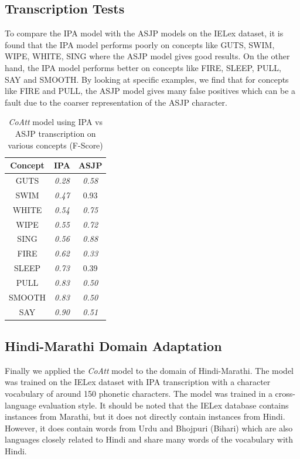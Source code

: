 \documentclass[11pt,letterpaper]{article}
\begin{document}
\subsection{Transcription Tests}

To compare the IPA model with the ASJP models on the IELex dataset, it is found that the IPA model performs poorly on concepts like GUTS, SWIM, WIPE, WHITE, SING where the ASJP model gives good results. On the other hand, the IPA model performs better on concepts like FIRE, SLEEP, PULL, SAY and SMOOTH. By looking at specific examples, we find that for concepts like FIRE and PULL, the ASJP model gives many false positives which can be a fault due to the coarser representation of the ASJP character.

\begin{table}[h]
\centering
\begin{tabular}{ccc}
\textbf{Concept} & \textbf{IPA}  & \textbf{ASJP} \\ \hline
GUTS             & \textit{0.28} & \textit{0.58} \\
SWIM             & \textit{0.47} & 0.93          \\
WHITE            & \textit{0.54} & \textit{0.75} \\
WIPE             & \textit{0.55} & \textit{0.72} \\
SING             & \textit{0.56} & \textit{0.88} \\ \hline
FIRE             & \textit{0.62} & \textit{0.33} \\
SLEEP            & \textit{0.73} & 0.39          \\
PULL             & \textit{0.83} & \textit{0.50} \\
SMOOTH           & \textit{0.83} & \textit{0.50} \\
SAY              & \textit{0.90} & \textit{0.51}
\end{tabular}
\caption{\textit{CoAtt} model using IPA vs ASJP transcription on various concepts (F-Score)}
\end{table}

\subsection{Hindi-Marathi Domain Adaptation}

Finally we applied the \textit{CoAtt} model to the domain of Hindi-Marathi. The model was trained on the IELex dataset with IPA transcription with a character vocabulary of around 150 phonetic characters. The model was trained in a cross-language evaluation style. It should be noted that the IELex database contains instances from Marathi, but it does not directly contain instances from Hindi. However, it does contain words from Urdu and Bhojpuri (Bihari) which are also languages closely related to Hindi and share many words of the vocabulary with Hindi.
\end{document}
